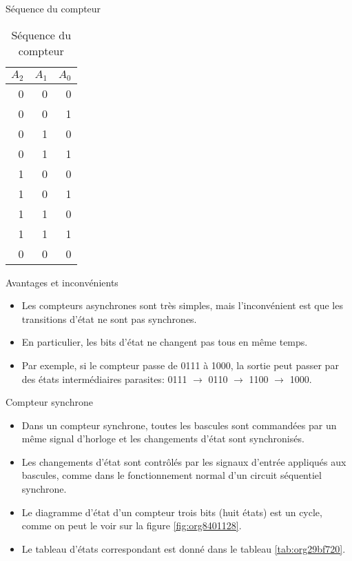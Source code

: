 \documentclass[presentation]{beamer}
\begin{document}
\begin{frame}[label={sec:org346dbae}]{Séquence du compteur}
\begin{table}[htbp]
\caption{\label{tab:org4b22519}Séquence du compteur}
\centering
\begin{tabular}{rrr}
\(A_2\) & \(A_1\) & \(A_0\)\\[0pt]
\hline
0 & 0 & 0\\[0pt]
0 & 0 & 1\\[0pt]
0 & 1 & 0\\[0pt]
0 & 1 & 1\\[0pt]
1 & 0 & 0\\[0pt]
1 & 0 & 1\\[0pt]
1 & 1 & 0\\[0pt]
1 & 1 & 1\\[0pt]
0 & 0 & 0\\[0pt]
\end{tabular}
\end{table}
\end{frame}

\begin{frame}[label={sec:orga8d719e}]{Avantages et inconvénients}
\begin{itemize}
\item Les compteurs asynchrones sont très simples, mais l'inconvénient est que les transitions d'état ne sont pas synchrones.

\item En particulier, les bits d'état ne changent pas tous en même temps.

\item Par exemple, si le compteur passe de 0111 à 1000, la sortie peut passer par des états intermédiaires parasites: 0111 \(\rightarrow\) 0110 \(\rightarrow\) 1100 \(\rightarrow\) 1000.
\end{itemize}
\end{frame}

\begin{frame}[label={sec:org00f1c93}]{Compteur synchrone}
\begin{itemize}
\item Dans un compteur synchrone, toutes les bascules sont commandées par un même signal d'horloge et les changements d'état sont synchronisés.

\item Les changements d'état sont contrôlés par les signaux d'entrée appliqués aux bascules, comme dans le fonctionnement normal d'un circuit séquentiel synchrone.

\item Le diagramme d'état d'un compteur trois bits (huit états) est un cycle, comme on peut le voir sur la figure \ref{fig:org8401128}.

\item Le tableau d'états correspondant est donné dans le tableau \ref{tab:org29bf720}.
\end{itemize}
\end{frame}
\end{document}

